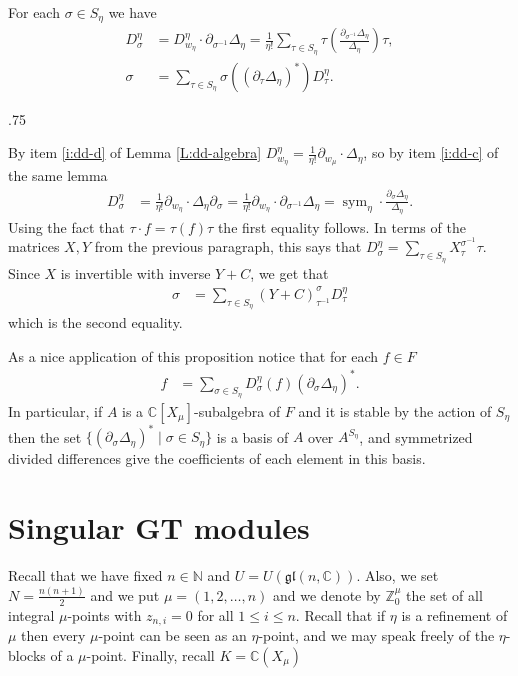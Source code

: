 \documentclass[11pt,fleqn]{article}
\makeatletter
\renewenvironment{proof}[1][\textit{Proof}]{\par
  \pushQED{\qed}%
  \normalfont \topsep.75\paraskip\relax
  \trivlist
  \item[\hskip\labelsep
        \itshape
    #1\@addpunct{.}]\ignorespaces
}{%
  \popQED\endtrivlist\@endpefalse
}
\newcommand\NN{\mathbb N}
\newcommand\CC{\mathbb C}
\newcommand\ZZ{\mathbb Z}
\newcommand\gl{\mathfrak{gl}}
\DeclareMathOperator\sym{sym}
\makeatother
\begin{document}
\begin{Proposition*}
For each $\sigma \in S_\eta$ we have
\begin{align*}
D_\sigma^\eta 
  &= D_{w_\eta}^\eta \cdot \partial_{\sigma^{-1}}\Delta_\eta
  = \frac{1}{\eta!}\sum_{\tau \in S_\eta} \tau \left(
    \frac{\partial_{\sigma^{-1}}\Delta_\eta}{\Delta_\eta} 
    \right) \tau,\\
\sigma
  &= \sum_{\tau \in S_\eta} 
    \sigma((\partial_\tau \Delta_\eta)^*)
    D_\tau^\eta. 
\end{align*}  
\end{Proposition*}
\begin{proof}
By item \ref{i:dd-d} of Lemma \ref{L:dd-algebra} $D^\eta_{w_\eta} = 
\frac{1}{\eta!} \partial_{w_\mu} \cdot \Delta_\eta $, so by item \ref{i:dd-c}
of the same lemma
\begin{align*}
D_\sigma^\eta 
  &= \frac{1}{\eta!} \partial_{w_\eta} \cdot \Delta_\eta \partial_\sigma
  = \frac{1}{\eta!} \partial_{w_\eta} \cdot \partial_{\sigma^{-1}} \Delta_\eta
  = \sym_\eta \cdot \frac{\partial_{\sigma}\Delta_\eta}{\Delta_\eta}.
\end{align*}
Using the fact that $\tau \cdot f = \tau(f) \tau$ the first equality follows.
In terms of the matrices $X, Y$ from the previous paragraph, this says that
$D_\sigma^\eta = \sum_{\tau \in S_\eta} X_\tau^{\sigma^{-1}} \tau$. Since $X$
is invertible with inverse $Y + C$, we get that
\begin{align*}
\sigma &= \sum_{\tau \in S_\eta} (Y+C)_{\tau^{-1}}^\sigma D_\tau^\eta
\end{align*}
which is the second equality.
\end{proof}

As a nice application of this proposition notice that for each $f \in F$ 
\begin{align*}
f &= \sum_{\sigma \in S_\eta} D_\sigma^\eta (f) 
  (\partial_{\sigma} \Delta_\eta)^*.
\end{align*}
In particular, if $A$ is a $\CC[X_\mu]$-subalgebra of $F$ and it is stable by 
the action of $S_\eta$ then the set $\{(\partial_\sigma \Delta_\eta)^* \mid 
\sigma \in S_\eta\}$ is a basis of $A$ over $A^{S_\eta}$, and symmetrized 
divided differences give the coefficients of each element in this basis.

\section{Singular GT modules}
\label{SINGULAR-GT}
Recall that we have fixed $n \in \NN$ and $U = U(\gl(n, \CC))$. Also, we set 
$N = \frac{n(n+1)}{2}$ and we put $\mu = (1,2,\ldots, n)$ and we 
denote by $\ZZ^\mu_0$ the set of all integral $\mu$-points with $z_{n,i} = 0$ 
for all $1 \leq i \leq n$. Recall that if $\eta$ is a refinement of $\mu$ then 
every $\mu$-point can be seen as an $\eta$-point, and we may speak freely of 
the $\eta$-blocks of a $\mu$-point. Finally, recall $K = \CC(X_\mu)$
\end{document}
